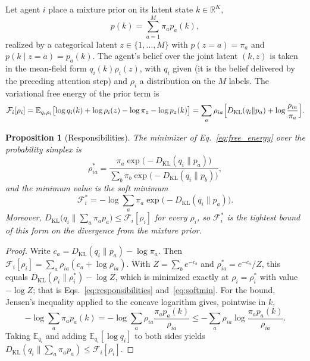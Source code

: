 \documentclass[11pt]{article}
\newtheorem{proposition}{Proposition}
\theoremstyle{definition}
\theoremstyle{remark}
\newcommand{\KL}{D_{\mathrm{KL}}}
\newcommand{\E}{\mathbb{E}}
\newcommand{\F}{\mathcal{F}}
\begin{document}
Let agent $i$ place a mixture prior on its latent state $k\in\mathbb{R}^K$,
\begin{equation}
p(k)=\sum_{a=1}^M\pi_a p_a(k),
\label{eq:mixture_prior}
\end{equation}
realized by a categorical latent $z\in\{1,\dots,M\}$ with $p(z=a)=\pi_a$ and $p(k\mid z=a)=p_a(k)$. The agent's belief over the joint latent $(k,z)$ is taken in the mean-field form $q_i(k)\rho_i(z)$, with $q_i$ given (it is the belief delivered by the preceding attention step) and $\rho_i$ a distribution on the $M$ labels. The variational free energy of the prior term is
\begin{equation}
\F_i[\rho_i]
=\E_{q_i\rho_i}\bigl[\log q_i(k)+\log\rho_i(z)-\log\pi_z-\log p_z(k)\bigr]
=\sum_a\rho_{ia}\Bigl[\KL(q_i\|p_a)+\log\frac{\rho_{ia}}{\pi_a}\Bigr].
\label{eq:free_energy}
\end{equation}

\begin{proposition}[Responsibilities]
\label{prop:responsibilities}
The minimizer of Eq.~\eqref{eq:free_energy} over the probability simplex is
\begin{equation}
\rho_{ia}^{*}=\frac{\pi_a\exp\bigl(-\KL(q_i\|p_a)\bigr)}{\sum_b\pi_b\exp\bigl(-\KL(q_i\|p_b)\bigr)},
\label{eq:responsibilities}
\end{equation}
and the minimum value is the soft minimum
\begin{equation}
\F_i^{*}=-\log\sum_a\pi_a\exp\bigl(-\KL(q_i\|p_a)\bigr).
\label{eq:softmin}
\end{equation}
Moreover, $\KL\bigl(q_i\|\sum_a\pi_ap_a\bigr)\le\F_i[\rho_i]$ for every $\rho_i$, so $\F_i^{*}$ is the tightest bound of this form on the divergence from the mixture prior.
\end{proposition}

\begin{proof}
Write $c_a=\KL(q_i\|p_a)-\log\pi_a$. Then $\F_i[\rho_i]=\sum_a\rho_{ia}(c_a+\log\rho_{ia})$. With $Z=\sum_be^{-c_b}$ and $\rho^{*}_{ia}=e^{-c_a}/Z$, this equals $\KL(\rho_i\|\rho_i^{*})-\log Z$, which is minimized exactly at $\rho_i=\rho_i^{*}$ with value $-\log Z$; that is Eqs.~\eqref{eq:responsibilities} and~\eqref{eq:softmin}. For the bound, Jensen's inequality applied to the concave logarithm gives, pointwise in $k$,
\begin{equation*}
-\log\sum_a\pi_ap_a(k)=-\log\sum_a\rho_{ia}\frac{\pi_ap_a(k)}{\rho_{ia}}
\le-\sum_a\rho_{ia}\log\frac{\pi_ap_a(k)}{\rho_{ia}}.
\end{equation*}
Taking $\E_{q_i}$ and adding $\E_{q_i}[\log q_i]$ to both sides yields $\KL(q_i\|\sum_a\pi_ap_a)\le\F_i[\rho_i]$.
\end{proof}
\end{document}
